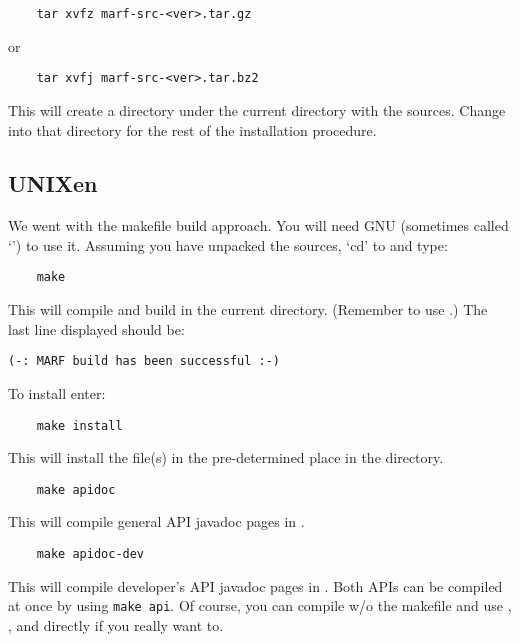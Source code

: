 \begin{verbatim}
    tar xvfz marf-src-<ver>.tar.gz
\end{verbatim}

\noindent
or

\begin{verbatim}
    tar xvfj marf-src-<ver>.tar.bz2
\end{verbatim}


\noindent
This will create a directory
 under the current directory
with the {\marf} sources.
Change into that directory for the rest
of the installation procedure.


\subsection{UNIXen}

We went with the makefile build approach. You will need
GNU  (sometimes called `') to use it. Assuming
you have unpacked the sources, `cd' to
 and type:

\begin{verbatim}
    make
\end{verbatim}

\noindent
This will compile and build  in the current directory.
(Remember to use {\gnu} .)
The last line displayed should be:

\begin{verbatim}
(-: MARF build has been successful :-)
\end{verbatim}

\noindent
To install {\marf} enter:

\begin{verbatim}
    make install
\end{verbatim}

\noindent
This will install the  file(s) in the pre-determined
place in the  directory.

\begin{verbatim}
    make apidoc
\end{verbatim}

\noindent
This will compile general API javadoc pages in .

\begin{verbatim}
    make apidoc-dev
\end{verbatim}

\noindent
This will compile developer's API javadoc pages in .
Both APIs can be compiled at once by using \texttt{make api}.
Of course, you can compile w/o the makefile and use ,
, and  directly if you really want to.

